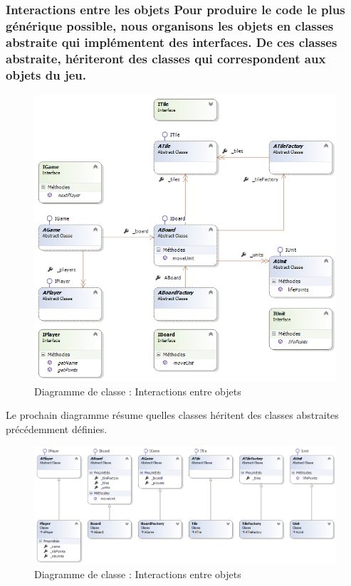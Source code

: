 \subsubsection{Interactions entre les objets
Pour produire le code le plus générique possible, nous organisons les objets en classes abstraite qui implémentent des interfaces. De ces classes abstraite, hériteront des classes qui correspondent aux objets du jeu.
}
\begin{figure}[!h] 
\centerline{\includegraphics[width=\textwidth]{img/cd_interactions_between_class.png}}
   \caption{\label{étiquette} Diagramme de classe : Interactions entre objets}
\label{inter_bet_class}
\end{figure}

Le prochain diagramme résume quelles classes héritent des classes abstraites précédemment définies.
\begin{figure}[!h] 
\centerline{\includegraphics[width=\textwidth]{img/cd_inter_with_abstract.png}}
   \caption{\label{étiquette} Diagramme de classe : Interactions entre objets}
\label{inter_with_abstract}
\end{figure}

